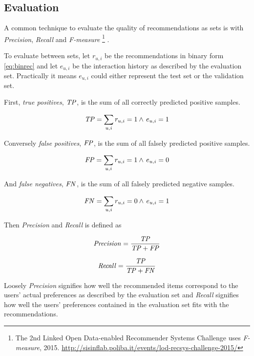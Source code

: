 
\subsection{Evaluation}\label{sec:background:theory:eval}

A common technique to evaluate the quality of recommendations as sets is with \textit{Precision}, \textit{Recall} and \textit{F-measure}
\footnote{The 2nd Linked Open Data-enabled Recommender Systems Challenge uses \textit{F-measure}, 2015. \url{http://sisinflab.poliba.it/events/lod-recsys-challenge-2015/}}
. \citep{bobadilla2013recommender}

To evaluate between sets, let $r_{u, i}$ be the recommendations in binary form \eqref{eq:binrec} and let $e_{u, i}$ be the interaction history as described by the evaluation set. Practically it means $e_{u, i}$ could either represent the test set or the validation set.

First, \textit{true positives}, $\mathit{TP}$, is the sum of all correctly predicted positive samples.

\begin{equation} \label{eq:tp}
    \mathit{TP} = \sum_{u, i} r_{u, i} = 1 \land \, e_{u, i} = 1
\end{equation}

Conversely \textit{false positives}, $\mathit{FP}$, is the sum of all falsely predicted positive samples.

\begin{equation} \label{eq:fp}
    \mathit{FP} = \sum_{u, i} r_{u, i} = 1 \land \, e_{u, i} = 0
\end{equation}

And \textit{false negatives}, $\mathit{FN}$, is the sum of all falsely predicted negative samples.

\begin{equation} \label{eq:fn}
    \mathit{FN} = \sum_{u, i} r_{u, i} = 0 \land \, e_{u, i} = 1
\end{equation}

Then \textit{Precision} and \textit{Recall} is defined as

\begin{equation} \label{eq:precision}
    \mathit{Precision} = \frac{\mathit{TP}}{\mathit{TP} + \mathit{FP}}
\end{equation}

\begin{equation} \label{eq:recall}
    \mathit{Recall} = \frac{\mathit{TP}}{\mathit{TP} + \mathit{FN}}
\end{equation}

Loosely \textit{Precision} signifies how well the recommended items correspond to the users' actual preferences as described by the evaluation set and \textit{Recall} signifies how well the users' preferences contained in the evaluation set fits with the recommendations.

